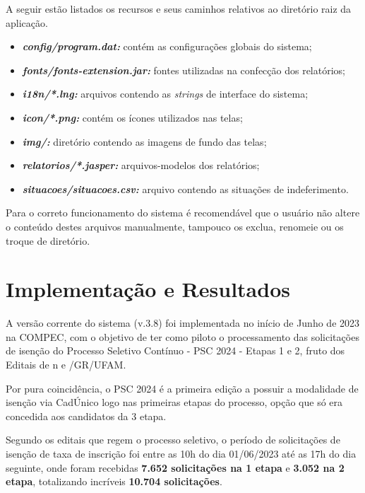 \documentclass[
	12pt,			%
	openright,		%
	oneside,	
	a4paper,		%
	english,		%
	brazil			%
]{abntex2/abntex2}  %
\begin{document}
			A seguir estão listados os recursos e seus caminhos relativos ao diretório raiz da aplicação.
			
			\begin{itemize}
				
				\item \textbf{\textit{config/program.dat:}} contém as configurações globais do sistema;
				\item \textbf{\textit{fonts/fonts-extension.jar:}} fontes utilizadas na confecção dos relatórios;
				\item \textbf{\textit{i18n/*.lng:}} arquivos contendo as \textit{strings} de interface do sistema;
				\item \textbf{\textit{icon/*.png:}} contém os ícones utilizados nas telas;
				\item \textbf{\textit{img/:}} diretório contendo as imagens de fundo das telas;
				\item \textbf{\textit{relatorios/*.jasper:}} arquivos-modelos dos relatórios;
				\item \textbf{\textit{situacoes/situacoes.csv:}} arquivo contendo as situações de indeferimento.
				
			\end{itemize}
			
			Para o correto funcionamento do sistema é recomendável que o usuário não altere o conteúdo destes arquivos manualmente, tampouco os exclua, renomeie ou os troque de diretório.

	\chapter{Implementação e Resultados}
	
		A versão corrente do sistema (v.3.8) foi implementada no início de Junho de 2023 na COMPEC, com o objetivo de ter como piloto o processamento das solicitações de isenção do Processo Seletivo Contínuo - PSC 2024 - Etapas 1 e 2, fruto dos Editais de n{\textordmasculine} \cite{edital-13} e \cite{edital-14}/GR/UFAM.
		
		Por pura coincidência, o PSC 2024 é a primeira edição a possuir a modalidade de isenção via CadÚnico logo nas primeiras etapas do processo, opção que só era concedida aos candidatos da 3{\textordfeminine} etapa.
		
		Segundo os editais que regem o processo seletivo, o período de solicitações de isenção de taxa de inscrição foi entre as 10h do dia 01/06/2023 até as 17h do dia seguinte, onde foram recebidas \textbf{7.652 solicitações na 1{\textordfeminine} etapa} e \textbf{3.052 na 2{\textordfeminine} etapa}, totalizando incríveis \textbf{10.704 solicitações}.
		
\end{document}
